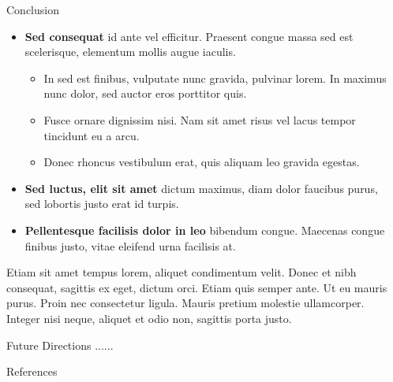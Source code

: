 \documentclass[final]{beamer}
\newlength{\sepwidth}
\newlength{\colwidth}
\newcommand{\separatorcolumn}{\begin{column}{\sepwidth}\end{column}}
\begin{document}
\begin{frame}[t]
\begin{columns}[t]
\begin{column}{\colwidth}
\begin{block}{Conclusion}
    \begin{itemize}
      \item \textbf{Sed consequat} id ante vel efficitur. Praesent congue massa
        sed est scelerisque, elementum mollis augue iaculis.
        \begin{itemize}
          \item In sed est finibus, vulputate
            nunc gravida, pulvinar lorem. In maximus nunc dolor, sed auctor eros
            porttitor quis.
          \item Fusce ornare dignissim nisi. Nam sit amet risus vel lacus
            tempor tincidunt eu a arcu.
          \item Donec rhoncus vestibulum erat, quis aliquam leo
            gravida egestas.
        \end{itemize}
      \item \textbf{Sed luctus, elit sit amet} dictum maximus, diam dolor
        faucibus purus, sed lobortis justo erat id turpis.
      \item \textbf{Pellentesque facilisis dolor in leo} bibendum congue.
        Maecenas congue finibus justo, vitae eleifend urna facilisis at.
    \end{itemize}
    Etiam sit amet tempus lorem, aliquet condimentum velit. Donec et nibh
    consequat, sagittis ex eget, dictum orci. Etiam quis semper ante. Ut eu
    mauris purus. Proin nec consectetur ligula. Mauris pretium molestie
    ullamcorper. Integer nisi neque, aliquet et odio non, sagittis porta justo.

  \end{block}

  \begin{block}{Future Directions}
......

  \end{block}

  
  \begin{block}{References}

    \nocite{*}
    \footnotesize{}

  \end{block}

\end{column}

\separatorcolumn
\end{columns}
\end{frame}
\end{document}
